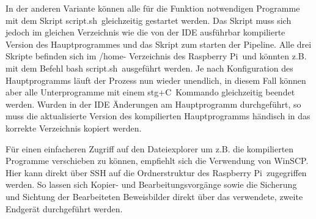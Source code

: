 In der anderen Variante können alle für die Funktion notwendigen Programme mit dem Skript \glqq script.sh\grqq\ gleichzeitig gestartet werden. Das Skript muss sich jedoch im gleichen Verzeichnis wie die von der IDE ausführbar kompilierte Version des Hauptprogrammes und das Skript zum starten der Pipeline. Alle drei Skripte befinden sich im /home- Verzeichnis des \glqq Raspberry Pi\grqq\  und könnten z.B. mit dem Befehl \glqq bash script.sh\grqq\ ausgeführt werden. Je nach Konfiguration des Hauptprogramms läuft der Prozess nun wieder unendlich, in diesem Fall können aber alle Unterprogramme mit einem \glqq stg+C\grqq\ Kommando gleichzeitig beendet werden. Wurden in der IDE Änderungen am Hauptprogramm durchgeführt, so muss die aktualisierte Version des kompilierten Hauptprogramms händisch in das korrekte Verzeichnis kopiert werden. 

Für einen einfacheren Zugriff auf den Dateiexplorer um z.B. die kompilierten Programme verschieben zu können, empfiehlt sich die Verwendung von \glqq WinSCP\grqq. Hier kann direkt über SSH auf die Ordnerstruktur des \glqq Raspberry Pi\grqq\ zugegriffen werden. So lassen sich Kopier- und Bearbeitungsvorgänge sowie die Sicherung und Sichtung der Bearbeiteten Beweisbilder direkt über das verwendete, zweite Endgerät durchgeführt werden.

\newpage
